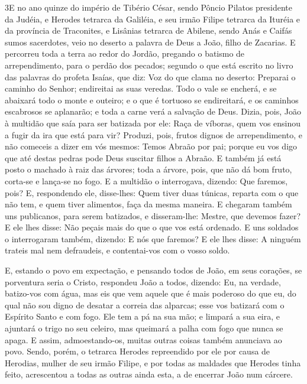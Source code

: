 \lettrine{3} E no ano quinze do império de Tibério César,
sendo Pôncio Pilatos presidente da Judéia, e Herodes tetrarca da
Galiléia, e seu irmão Filipe tetrarca da Ituréia e da província de
Traconites, e Lisânias tetrarca de Abilene, sendo Anás e Caifás
sumos sacerdotes, veio no deserto a palavra de Deus a João, filho de
Zacarias. E percorreu toda a terra ao redor do Jordão, pregando
o batismo de arrependimento, para o perdão dos pecados; segundo
o que está escrito no livro das palavras do profeta Isaías, que diz:
Voz do que clama no deserto: Preparai o caminho do Senhor;
endireitai as suas veredas. Todo o vale se encherá, e se
abaixará todo o monte e outeiro; e o que é tortuoso se endireitará,
e os caminhos escabrosos se aplanarão; e toda a carne verá a
salvação de Deus. Dizia, pois, João à multidão que saía para ser
batizada por ele: Raça de víboras, quem vos ensinou a fugir da ira
que está para vir? Produzi, pois, frutos dignos de
arrependimento, e não comeceis a dizer em vós mesmos: Temos Abraão
por pai; porque eu vos digo que até destas pedras pode Deus suscitar
filhos a Abraão. E também já está posto o machado à raiz das
árvores; toda a árvore, pois, que não dá bom fruto, corta-se e
lança-se no fogo. E a multidão o interrogava, dizendo: Que
faremos, pois? E, respondendo ele, disse-lhes: Quem tiver
duas túnicas, reparta com o que não tem, e quem tiver alimentos,
faça da mesma maneira. E chegaram também uns publicanos, para
serem batizados, e disseram-lhe: Mestre, que devemos fazer? E
ele lhes disse: Não peçais mais do que o que vos está ordenado.
E uns soldados o interrogaram também, dizendo: E nós que
faremos? E ele lhes disse: A ninguém trateis mal nem defraudeis, e
contentai-vos com o vosso soldo.

E, estando o povo em expectação, e pensando todos de João, em
seus corações, se porventura seria o Cristo, respondeu João a
todos, dizendo: Eu, na verdade, batizo-vos com água, mas eis que vem
aquele que é mais poderoso do que eu, do qual não sou digno de
desatar a correia das alparcas; esse vos batizará com o Espírito
Santo e com fogo. Ele tem a pá na sua mão; e limpará a sua
eira, e ajuntará o trigo no seu celeiro, mas queimará a palha com
fogo que nunca se apaga. E assim, admoestando-os, muitas
outras coisas também anunciava ao povo. Sendo, porém, o
tetrarca Herodes repreendido por ele por causa de Herodias, mulher
de seu irmão Filipe, e por todas as maldades que Herodes tinha
feito, acrescentou a todas as outras ainda esta, a de
encerrar João num cárcere.

